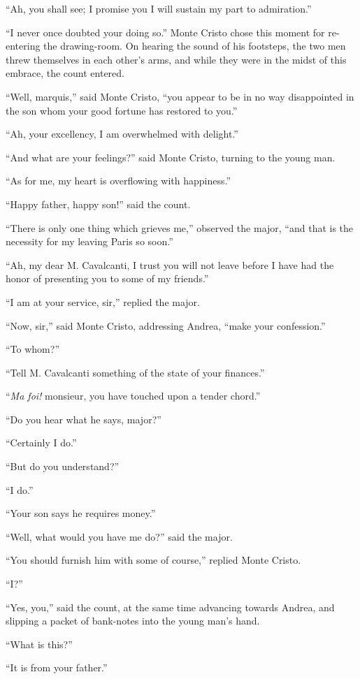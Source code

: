 “Ah, you shall see; I promise you I will sustain my part to
admiration.”

“I never once doubted your doing so.” Monte Cristo chose this moment
for re-entering the drawing-room. On hearing the sound of his
footsteps, the two men threw themselves in each other’s arms, and while
they were in the midst of this embrace, the count entered.

“Well, marquis,” said Monte Cristo, “you appear to be in no way
disappointed in the son whom your good fortune has restored to you.”

“Ah, your excellency, I am overwhelmed with delight.”

“And what are your feelings?” said Monte Cristo, turning to the young
man.

“As for me, my heart is overflowing with happiness.”

“Happy father, happy son!” said the count.

“There is only one thing which grieves me,” observed the major, “and
that is the necessity for my leaving Paris so soon.”

“Ah, my dear M. Cavalcanti, I trust you will not leave before I have
had the honor of presenting you to some of my friends.”

“I am at your service, sir,” replied the major.

“Now, sir,” said Monte Cristo, addressing Andrea, “make your
confession.”

“To whom?”

“Tell M. Cavalcanti something of the state of your finances.”

“\textit{Ma foi!} monsieur, you have touched upon a tender chord.”

“Do you hear what he says, major?”

“Certainly I do.”

“But do you understand?”

“I do.”

“Your son says he requires money.”

“Well, what would you have me do?” said the major.

“You should furnish him with some of course,” replied Monte Cristo.

“I?”

“Yes, you,” said the count, at the same time advancing towards Andrea,
and slipping a packet of bank-notes into the young man’s hand.

“What is this?”

“It is from your father.”

